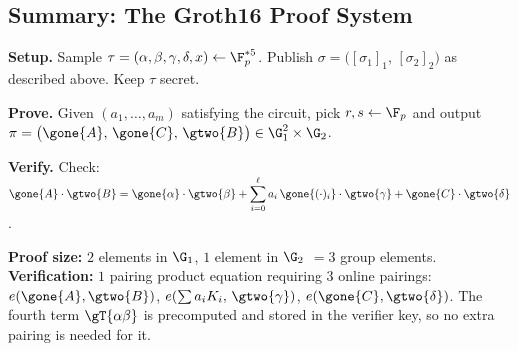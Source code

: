 \subsection*{Summary: The Groth16 Proof System}

\begin{tcolorbox}[enhanced, colback=blue!3!white, colframe=blue!45!black,
                  arc=2.5pt, boxrule=1pt, left=6pt, right=6pt, top=5pt, bottom=5pt]
\small
\textbf{Setup.} Sample $\tau = (\alpha,\beta,\gamma,\delta,x) \leftarrow \F_p^{*5}$.
Publish $\sigma = \bigl([\sigma_1]_1,\, [\sigma_2]_2\bigr)$ as described above. Keep $\tau$ secret.

\medskip
\textbf{Prove.} Given $(a_1,\ldots,a_m)$ satisfying the circuit, pick $r,s \leftarrow \F_p$ and output
$\pi = \bigl(\gone{A},\, \gone{C},\, \gtwo{B}\bigr) \in \G_1^2 \times \G_2$.

\medskip
\textbf{Verify.} Check:
$\gone{A} \cdot \gtwo{B} = \gone{\alpha}\cdot\gtwo{\beta} + \displaystyle\sum_{i=0}^{\ell} a_i\,\gone{(\cdot)_i}\cdot\gtwo{\gamma} + \gone{C}\cdot\gtwo{\delta}$.

\medskip
\textbf{Proof size:} \quad $2$ elements in $\G_1$, \quad $1$ element in $\G_2$ \quad $= 3$ group elements.\\
\textbf{Verification:} \quad $1$ pairing product equation requiring $3$ online pairings:
$e(\gone{A}, \gtwo{B})$,\; $e\!\left(\textstyle\sum a_i K_i,\, \gtwo{\gamma}\right)$,\; $e(\gone{C}, \gtwo{\delta})$.
The fourth term $\gT{\alpha\beta}$ is precomputed and stored in the verifier key, so no extra pairing is needed for it.
\end{tcolorbox}
